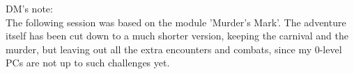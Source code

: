 DM's note:\\

The following session was based on the module 'Murder's Mark'. The adventure itself has been cut down to a much shorter version, keeping the carnival and the murder, but leaving out all the extra encounters and combats, since my 0-level PCs are not up to such challenges yet.\\

